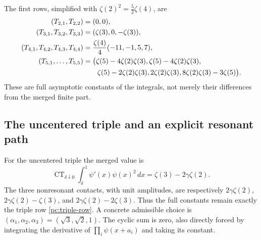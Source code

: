 \documentclass[11pt,a4paper]{article}
\theoremstyle{definition}
\theoremstyle{remark}
\numberwithin{equation}{section}
\begin{document}
The first rows, simplified with $\zeta(2)^2=\tfrac52\zeta(4)$, are
\begin{align}
 (T_{2,1},T_{2,2})&=(0,0),\\
 (T_{3,1},T_{3,2},T_{3,3})&=(\zeta(3),0,-\zeta(3)),
                                                  \label{pc:triple-row}\\
 (T_{4,1},T_{4,2},T_{4,3},T_{4,4})
   &=\frac{\zeta(4)}4(-11,-1,5,7),
                                                  \label{pc:fourth-row}\\
 (T_{5,1},\ldots,T_{5,5})
   &=\bigl(\zeta(5)-4\zeta(2)\zeta(3),
            \zeta(5)-4\zeta(2)\zeta(3),\notag\\
   &\qquad\zeta(5)-2\zeta(2)\zeta(3),
            2\zeta(2)\zeta(3),
            8\zeta(2)\zeta(3)-3\zeta(5)\bigr).
                                                  \label{pc:fifth-row}
\end{align}
These are full asymptotic constants of the integrals, not merely their
differences from the merged finite part.

\subsection{The uncentered triple and an explicit resonant path}

For the uncentered triple the merged value is
\begin{equation}\label{pc:triple-baseline}
 \operatorname{CT}_{\delta\downarrow0}
       \int_\delta^1\psi'(x)\psi(x)^2\,dx
           =\zeta(3)-2\gamma\zeta(2).
\end{equation}
The three nonresonant contacts, with unit amplitudes, are respectively
$2\gamma\zeta(2)$,
$2\gamma\zeta(2)-\zeta(3)$, and
$2\gamma\zeta(2)-2\zeta(3)$.  Thus the full constants remain
exactly the triple row \eqref{pc:triple-row}.  A concrete admissible
choice is $(\alpha_1,\alpha_2,\alpha_3)=(\sqrt3,\sqrt2,1)$.
The cyclic sum is zero, also directly forced by integrating the
derivative of $\prod_i\psi(x+a_i)$ and taking its constant.
\end{document}
